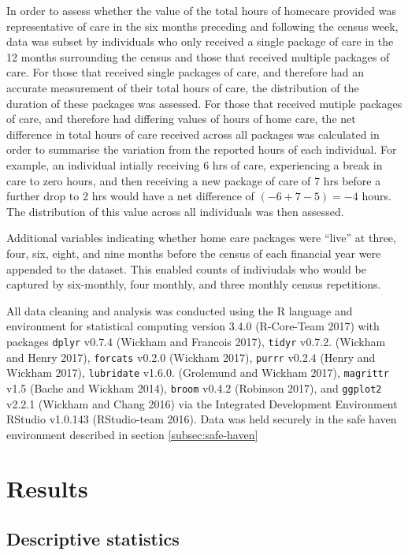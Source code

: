 \documentclass[]{article}
\begin{document}
In order to assess whether the value of the total hours of homecare
provided was representative of care in the six months preceding and
following the census week, data was subset by individuals who only
received a single package of care in the 12 months surrounding the
census and those that received multiple packages of care. For those that
received single packages of care, and therefore had an accurate
measurement of their total hours of care, the distribution of the
duration of these packages was assessed. For those that received mutiple
packages of care, and therefore had differing values of hours of home
care, the net difference in total hours of care received across all
packages was calculated in order to summarise the variation from the
reported hours of each individual. For example, an individual intially
receiving 6 hrs of care, experiencing a break in care to zero hours, and
then receiving a new package of care of 7 hrs before a further drop to 2
hrs would have a net difference of \((-6 + 7 - 5) = -4\) hours. The
distribution of this value across all individuals was then assessed.

Additional variables indicating whether home care packages were ``live''
at three, four, six, eight, and nine months before the census of each
financial year were appended to the dataset. This enabled counts of
indiviudals who would be captured by six-monthly, four monthly, and
three monthly census repetitions.

All data cleaning and analysis was conducted using the R language and
environment for statistical computing version 3.4.0 (R-Core-Team 2017)
with packages \texttt{dplyr} v0.7.4 (Wickham and Francois 2017),
\texttt{tidyr} v0.7.2. (Wickham and Henry 2017), \texttt{forcats} v0.2.0
(Wickham 2017), \texttt{purrr} v0.2.4 (Henry and Wickham 2017),
\texttt{lubridate} v1.6.0. (Grolemund and Wickham 2017),
\texttt{magrittr} v1.5 (Bache and Wickham 2014), \texttt{broom} v0.4.2
(Robinson 2017), and \texttt{ggplot2} v2.2.1 (Wickham and Chang 2016)
via the Integrated Development Environment RStudio v1.0.143
(RStudio-team 2016). Data was held securely in the safe haven
environment described in section \ref{subsec:safe-haven}

\FloatBarrier

\section{Results}\label{sec:renf-results}

\subsection{Descriptive statistics}\label{subsec:renf-descriptives}
\end{document}
